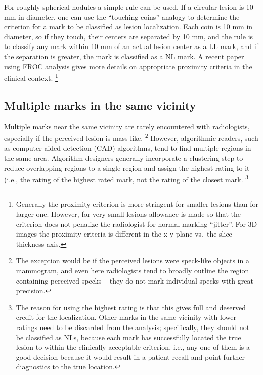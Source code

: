 \documentclass[
]{book}
\begin{document}
For roughly spherical nodules a simple rule can be used. If a circular lesion is 10 mm in diameter, one can use the ``touching-coins'' analogy to determine the criterion for a mark to be classified as lesion localization. Each coin is 10 mm in diameter, so if they touch, their centers are separated by 10 mm, and the rule is to classify any mark within 10 mm of an actual lesion center as a LL mark, and if the separation is greater, the mark is classified as a NL mark. A recent paper \citep{Dobbins2016MultiInstitutional} using FROC analysis gives more details on appropriate proximity criteria in the clinical context. \footnote{Generally the proximity criterion is more stringent for smaller lesions than for larger one. However, for very small lesions allowance is made so that the criterion does not penalize the radiologist for normal marking ``jitter''. For 3D images the proximity criteria is different in the x-y plane vs.~the slice thickness axis.}

\hypertarget{multiple-marks-in-the-same-vicinity}{%
\subsection{Multiple marks in the same vicinity}\label{multiple-marks-in-the-same-vicinity}}

Multiple marks near the same vicinity are rarely encountered with radiologists, especially if the perceived lesion is mass-like. \footnote{The exception would be if the perceived lesions were speck-like objects in a mammogram, and even here radiologists tend to broadly outline the region containing perceived specks -- they do not mark individual specks with great precision.} However, algorithmic readers, such as computer aided detection (CAD) algorithms, tend to find multiple regions in the same area. Algorithm designers generally incorporate a clustering step to reduce overlapping regions to a single region and assign the highest rating to it (i.e., the rating of the highest rated mark, not the rating of the closest mark. \footnote{The reason for using the highest rating is that this gives full and deserved credit for the localization. Other marks in the same vicinity with lower ratings need to be discarded from the analysis; specifically, they should not be classified as NLs, because each mark has successfully located the true lesion to within the clinically acceptable criterion, i.e., any one of them is a good decision because it would result in a patient recall and point further diagnostics to the true location.}
\end{document}
